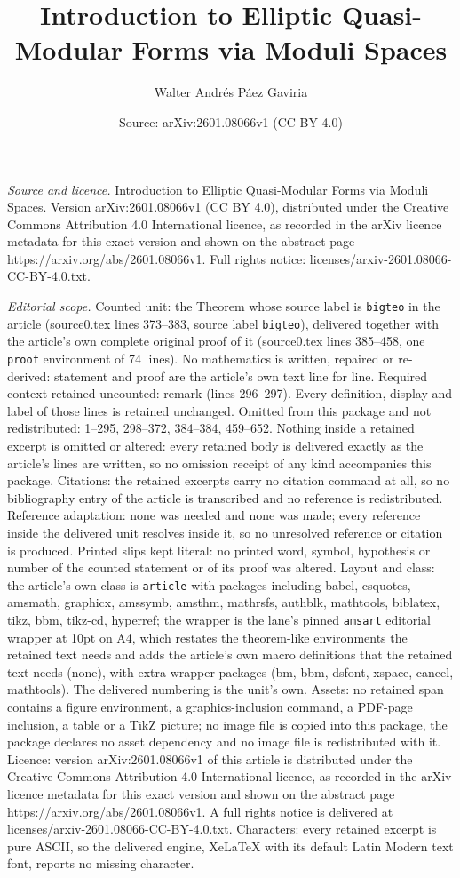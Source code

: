 \documentclass[10pt,a4paper]{amsart}
\title[Introduction to Elliptic Quasi-Modular Forms via Moduli Spac]{Introduction to Elliptic Quasi-Modular Forms via Moduli Spaces}
\author{Walter Andr\'es P\'aez Gaviria}
\date{Source: arXiv:2601.08066v1 (CC BY 4.0)}
\begin{document}
\maketitle

\noindent\emph{Source and licence.} Introduction to Elliptic Quasi-Modular Forms via Moduli Spaces. Version arXiv:2601.08066v1 (CC BY 4.0), distributed under the Creative Commons Attribution 4.0 International licence, as recorded in the arXiv licence metadata for this exact version and shown on the abstract page https://arxiv.org/abs/2601.08066v1. Full rights notice: licenses/arxiv-2601.08066-CC-BY-4.0.txt.\par\smallskip

\noindent\textit{Editorial scope.} Counted unit: the Theorem whose source label is \texttt{bigteo} in the article (source0.tex lines 373--383, source label \texttt{bigteo}), delivered together with the article's own complete original proof of it (source0.tex lines 385--458, one \texttt{proof} environment of 74 lines). No mathematics is written, repaired or re-derived: statement and proof are the article's own text line for line. Required context retained uncounted: remark (lines 296--297). Every definition, display and label of those lines is retained unchanged. Omitted from this package and not redistributed: 1--295, 298--372, 384--384, 459--652. Nothing inside a retained excerpt is omitted or altered: every retained body is delivered exactly as the article's lines are written, so no omission receipt of any kind accompanies this package. Citations: the retained excerpts carry no citation command at all, so no bibliography entry of the article is transcribed and no reference is redistributed. Reference adaptation: none was needed and none was made; every reference inside the delivered unit resolves inside it, so no unresolved reference or citation is produced. Printed slips kept literal: no printed word, symbol, hypothesis or number of the counted statement or of its proof was altered. Layout and class: the article's own class is \texttt{article} with packages including babel, csquotes, amsmath, graphicx, amssymb, amsthm, mathrsfs, authblk, mathtools, biblatex, tikz, bbm, tikz-cd, hyperref; the wrapper is the lane's pinned \texttt{amsart} editorial wrapper at 10pt on A4, which restates the theorem-like environments the retained text needs and adds the article's own macro definitions that the retained text needs (none), with extra wrapper packages (bm, bbm, dsfont, xspace, cancel, mathtools). The delivered numbering is the unit's own. Assets: no retained span contains a figure environment, a graphics-inclusion command, a PDF-page inclusion, a table or a TikZ picture; no image file is copied into this package, the package declares no asset dependency and no image file is redistributed with it. Licence: version arXiv:2601.08066v1 of this article is distributed under the Creative Commons Attribution 4.0 International licence, as recorded in the arXiv licence metadata for this exact version and shown on the abstract page https://arxiv.org/abs/2601.08066v1. A full rights notice is delivered at licenses/arxiv-2601.08066-CC-BY-4.0.txt. Characters: every retained excerpt is pure ASCII, so the delivered engine, XeLaTeX with its default Latin Modern text font, reports no missing character.
\end{document}
